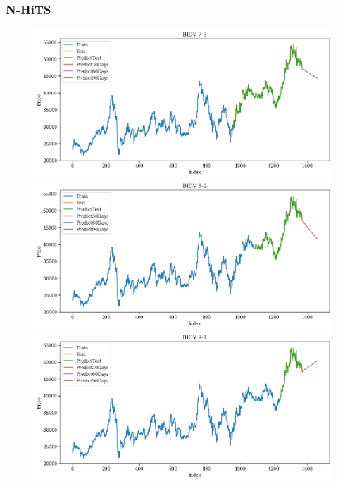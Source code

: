 \subsubsection{N-HiTS}
\begin{figure}[H]
    \centering
    \begin{minipage}{0.15\textwidth}
    \centering
    \includegraphics[width=1\textwidth]{resources/chapter-5/newdata1/result/BIDV_N-HiTS_7-3.png}
    \end{minipage}
    \hfill
    \begin{minipage}{0.15\textwidth}
    \centering
    \includegraphics[width=1\textwidth]{resources/chapter-5/newdata1/result/BIDV_N-HiTS_8-2.png}
    \end{minipage}
    \hfill
        \begin{minipage}{0.15\textwidth}
    \centering
    \includegraphics[width=1\textwidth]{resources/chapter-5/newdata1/result/BIDV_N-HiTS_9-1.png}

\end{minipage}
\end{figure}
